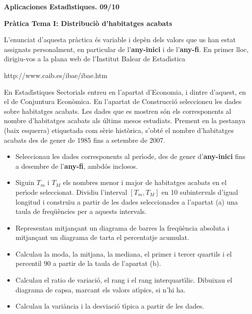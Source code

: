 \documentclass[11pt]{article}
\begin{document}
\begin{center}
\textbf{{\large{Aplicaciones Estad\'{\i}stiques.  09/10}}}

\vspace{0.5cm}

\textbf{Pr\`atica Tema I: Distribuci\`o d'habitatges acabats}
\end{center} 

L'enunciat d'aquesta pr\`actica \'es variable i dep\`en dels valors que us han estat assignats personalment, en particular de l'\textbf{any-inici} i de l'\textbf{any-fi}. En primer lloc, dirigiu-vos a la plana web de l'Institut Balear de Estad\'{\i}stica 
\begin{center}
http://www.caib.es/ibae/ibae.htm
\end{center}
En Estad\'{\i}stiques Sectorials entreu en l'apartat d'Economia, i dintre d'aquest, en el de Conjuntura Econ\`omica. En l'apartat de Construcci\'o seleccioneu les dades sobre habitatges acabats. Les dades que es mostren s\'on els corresponents al nombre d'habitatges acabats als \'ultims mesos estudiats. Prement en la pestanya (baix esquerra) etiquetada com s\`erie hist\`orica, s'obt\'e el nombre d'habitatges acabats des de gener de 1985 fins a setembre de 2007.

\begin{itemize}
\item [(a)] Seleccionau les dades corresponents al per\'{\i}ode, des de gener d'\textbf{any-inici} fins a desembre de l'\textbf{any-fi}, ambd\'os inclosos.
\item [(b)] Siguin $T_m$ i $T_M$ els nombres menor i major de habitatges acabats en el per\'{\i}ode seleccionat. Dividiu l'interval $[T_m,T_M]$ en 10 subintervals d'igual longitud i constru\"{\i}u a partir de les dades seleccionades a l'apartat (a) una taula de freq\"u\`encies per a aquests intervals.
\item [(c)] Representau mitjan\c{c}ant un diagrama de barres la freq\"u\`encia absoluta i mitjan\c{c}ant un diagrama de 
tarta el percentatje acumulat.
\item [(d)] Calculau la moda, la mitjana, la mediana, el primer i tercer quartils i el percentil
90 a partir de la taula de l'apartat (b).
\item [(e)] Calculau el ratio de variaci\'o, el rang i el rang interquart\'{\i}lic. Dibuixau el diagrama de capsa, marcant els valors at\'{\i}pics, si n'hi ha. 
\item [(f)] Calculau la vari\`ancia i la desviaci\'o t\'{\i}pica a partir de les dades.
\end{itemize}
\end{document}
